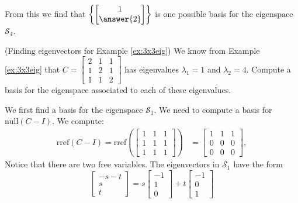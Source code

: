 \documentclass{ximera}
\begin{document}
\begin{example}
\begin{explanation}
From this we find that $\left\{\begin{bmatrix}1\\\answer{2}\end{bmatrix}\right\}$ is one possible basis for the eigenspace $\mathcal{S}_4$.
\end{explanation}
\end{example}

\begin{example}\label{ex:eigvectors3x3eig} (Finding eigenvectors for Example \ref{ex:3x3eig})
We know from Example \ref{ex:3x3eig} that $C=\begin{bmatrix} 2 & 1 & 1\\ 1 & 2 & 1\\ 1 & 1 & 2\end{bmatrix}$ has eigenvalues $\lambda_1=1$ and $\lambda_2=4$.  Compute a basis for the eigenspace associated to each of these eigenvalues.
\begin{explanation}
We first find a basis for the eigenspace $\mathcal{S}_1$.  We need to compute a basis for $\mbox{null}(C-I)$.  We compute:
\begin{align*}\mbox{rref}(C-I)=\mbox{rref}\left(\begin{bmatrix} 1 & 1 & 1\\ 1 & 1 & 1\\ 1 & 1 & 1\end{bmatrix}\right)&=\begin{bmatrix} 1 & 1 & 1\\ 0 & 0 & 0\\ 0 & 0 & 0\end{bmatrix},
\end{align*}
Notice that there are two free variables.  %
The eigenvectors in $\mathcal{S}_1$ have the form
$$\begin{bmatrix}-s-t\\s\\t\end{bmatrix} = s\begin{bmatrix}-1\\1\\0\end{bmatrix} + t\begin{bmatrix}-1\\0\\1\end{bmatrix}$$


\end{explanation}
\end{example}
\end{document}
